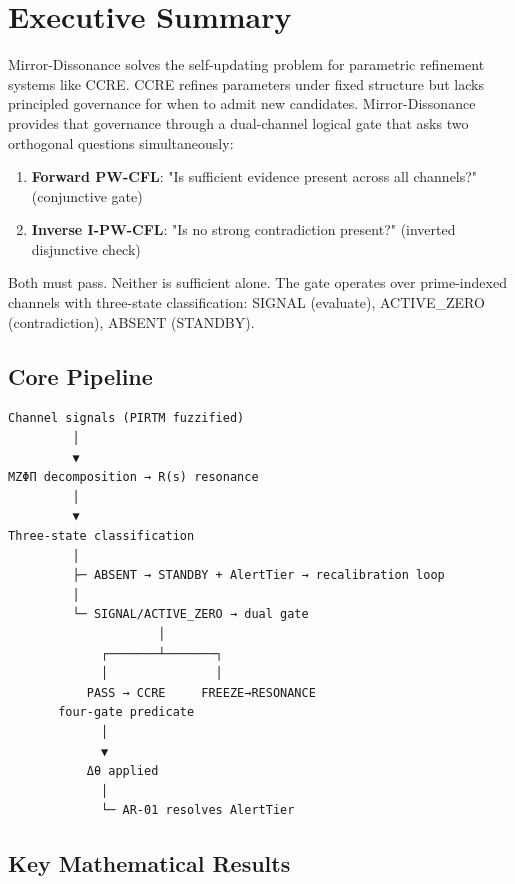 \documentclass[11pt]{article}
\begin{document}
\newpage
\tableofcontents
\newpage

\section{Executive Summary}

Mirror-Dissonance solves the self-updating problem for parametric refinement systems like CCRE. CCRE refines parameters under fixed structure but lacks principled governance for when to admit new candidates. Mirror-Dissonance provides that governance through a dual-channel logical gate that asks two orthogonal questions simultaneously:

\begin{enumerate}
\item \textbf{Forward PW-CFL}: "Is sufficient evidence present across all channels?" (conjunctive gate)
\item \textbf{Inverse I-PW-CFL}: "Is no strong contradiction present?" (inverted disjunctive check)
\end{enumerate}

Both must pass. Neither is sufficient alone. The gate operates over prime-indexed channels with three-state classification: SIGNAL (evaluate), ACTIVE\_ZERO (contradiction), ABSENT (STANDBY).

\subsection{Core Pipeline}

\begin{verbatim}
Channel signals (PIRTM fuzzified)
         │
         ▼
MZΦΠ decomposition → R(s) resonance
         │
         ▼
Three-state classification
         │
         ├─ ABSENT → STANDBY + AlertTier → recalibration loop
         │
         └─ SIGNAL/ACTIVE_ZERO → dual gate
                     │
             ┌───────┴───────┐
             │               │
           PASS → CCRE     FREEZE→RESONANCE
       four-gate predicate
             │
             ▼
           Δθ applied
             │
             └─ AR-01 resolves AlertTier
\end{verbatim}

\subsection{Key Mathematical Results}
\end{document}
